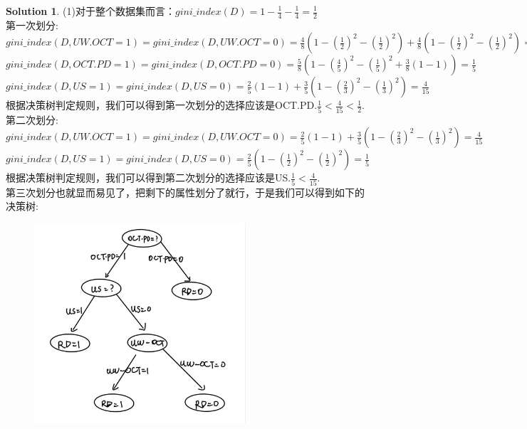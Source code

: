 \documentclass[a4paper]{article}
\numberwithin{equation}{section}
\theoremstyle{definition}
\newtheorem*{solution}{Solution}
\begin{document}
\begin{solution}
	(1)对于整个数据集而言：$gini\_index(D)= 1 - \frac{1}{4} - \frac{1}{4} = \frac{1}{2} $\\
    第一次划分:\\
    $gini\_index(D,UW.OCT = 1) =gini\_index(D,UW.OCT = 0) =\frac{4}{8}(1- (\frac{1}{2})^2 - (\frac{1}{2})^2) + \frac{4}{8}(1 - (\frac{1}{2})^2 - (\frac{1}{2})^2) = \frac{1}{2}$\\
    $gini\_index(D,OCT.PD = 1) =gini\_index(D,OCT.PD = 0) =\frac{5}{8}(1- (\frac{4}{5})^2 - (\frac{1}{5})^2  + \frac{3}{8}(1 - 1)) = \frac{1}{5}$\\
    $gini\_index(D,US = 1) =gini\_index(D,US = 0) = \frac{2}{5}(1 - 1) + \frac{3}{5}(1 - (\frac{2}{3})^2 - (\frac{1}{3})^2) = \frac{4}{15}$\\
    根据决策树判定规则，我们可以得到第一次划分的选择应该是OCT.PD.$\frac{1}{5} < \frac{4}{15} < \frac{1}{2}$.\\
    第二次划分:\\
    $gini\_index(D,UW.OCT = 1) = gini\_index(D,UW.OCT = 0) =\frac{2}{5}(1-1) + \frac{3}{5}(1 - (\frac{2}{3})^2 - (\frac{1}{3})^2) = \frac{4}{15}$\\
    $gini\_index(D,US = 1) = gini\_index(D,US = 0) = \frac{2}{5}(1 - (\frac{1}{2})^2 - (\frac{1}{2})^2) = \frac{1}{5}$\\
    根据决策树判定规则，我们可以得到第二次划分的选择应该是US.$\frac{1}{5} < \frac{4}{15}$.\\
    第三次划分也就显而易见了，把剩下的属性划分了就行，于是我们可以得到如下的决策树:\\
    \begin{figure}[H]
		\centering
		\includegraphics[width=0.7\textwidth]{DT.png}

\end{figure}
\end{solution}
\end{document}
